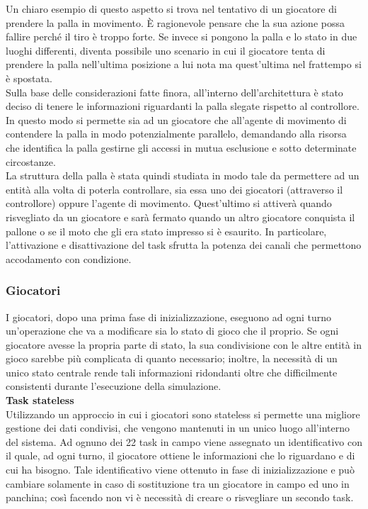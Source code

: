 Un chiaro esempio di questo aspetto si trova nel tentativo di un giocatore di prendere la palla in movimento. È ragionevole pensare che la sua azione possa fallire perché il tiro è troppo forte. Se invece si pongono la palla e lo stato in due luoghi differenti, diventa possibile uno scenario in cui il giocatore tenta di prendere la palla nell'ultima posizione a lui nota ma quest'ultima nel frattempo si è spostata.\\

Sulla base delle considerazioni fatte finora, all'interno dell'architettura è stato deciso di tenere le informazioni riguardanti la palla slegate rispetto al controllore. In questo modo si permette sia ad un giocatore che all'agente di movimento di contendere la palla in modo potenzialmente parallelo, demandando alla risorsa che identifica la palla gestirne gli accessi in mutua esclusione e sotto determinate circostanze.\\

La struttura della palla è stata quindi studiata in modo tale da permettere ad un entità alla volta di poterla controllare, sia essa uno dei giocatori (attraverso il controllore) oppure l'agente di movimento. Quest'ultimo si attiverà quando risvegliato da un giocatore e sarà fermato quando un altro giocatore conquista il pallone o se il moto che gli era stato impresso si è esaurito. In particolare, l'attivazione e disattivazione del task sfrutta la potenza dei canali che permettono accodamento con condizione.

\subsubsection{Giocatori}
\label{sec:analisi_concorrenza_giocatori}

I giocatori, dopo una prima fase di inizializzazione, eseguono ad ogni turno un'operazione che va a modificare sia lo stato di gioco che il proprio. Se ogni giocatore avesse la propria parte di stato, la sua condivisione con le altre entità in gioco sarebbe più complicata di quanto necessario; inoltre, la necessità di un unico stato centrale rende tali informazioni ridondanti oltre che difficilmente consistenti durante l'esecuzione della simulazione.\\

\textbf{Task stateless}\\

Utilizzando un approccio in cui i giocatori sono stateless si permette una migliore gestione dei dati condivisi, che vengono mantenuti in un unico luogo all'interno del sistema. Ad ognuno dei 22 task in campo viene assegnato un identificativo con il quale, ad ogni turno, il giocatore ottiene le informazioni che lo riguardano e di cui ha bisogno. Tale identificativo viene ottenuto in fase di inizializzazione e può cambiare solamente in caso di sostituzione tra un giocatore in campo ed uno in panchina; così facendo non vi è necessità di creare o risvegliare un secondo task.\\

